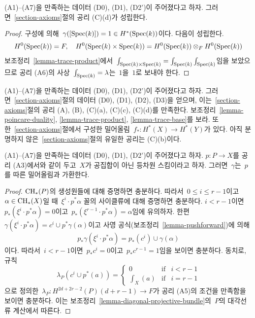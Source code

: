 \begin{lemma}
\label{lemma-trace-base}
(A1)--(A7)을 만족하는 데이터 (D0), (D1), (D2')이 주어졌다고 하자.
그러면\  \ref{section-axioms}절의 공리 (C)(d)가 성립한다.
\end{lemma}

\begin{proof}
구성에 의해\  $\gamma([\mathop{\mathrm{Spec}}(k)]) = 1 \in H^*(\mathop{\mathrm{Spec}}(k))$이다. 다음이
성립한다.
$$
H^0(\mathop{\mathrm{Spec}}(k)) = F,\quad
H^0(\mathop{\mathrm{Spec}}(k) \times \mathop{\mathrm{Spec}}(k)) = H^0(\mathop{\mathrm{Spec}}(k)) \otimes_F H^0(\mathop{\mathrm{Spec}}(k))
$$
보조정리\  \ref{lemma-trace-product}에서\ 
$\int_{\mathop{\mathrm{Spec}}(k) \times \mathop{\mathrm{Spec}}(k)} = \int_{\mathop{\mathrm{Spec}}(k)} \int_{\mathop{\mathrm{Spec}}(k)}$임을
보았으므로 공리 (A6)의 사상\  $\int_{\mathop{\mathrm{Spec}}(k)} = \lambda$는\  $1$을\ 
$1$로 보내야 한다.
\end{proof}

\noindent
(A1)--(A7)을 만족하는 데이터 (D0), (D1), (D2')이 주어졌다고 하자.
그러면\  \ref{section-axioms}절의 데이터 (D0), (D1), (D2), (D3)을
얻으며, 이는\  \ref{section-axioms}절의 공리 (A), (B), (C)(a),
(C)(c), (C)(d)를
만족한다. 보조정리\  \ref{lemma-poincare-duality},
\ref{lemma-trace-product}, \ref{lemma-trace-base}를 보라. 또한\ 
\ref{section-axioms}절에서 구성한 밀어올림\ 
$f_* : H^*(X) \to H^*(Y)$가 있다. 아직 분명하지 않은\ 
\ref{section-axioms}절의 유일한 공리는 (C)(b)이다.

\begin{lemma}
\label{lemma-ok-for-projective-bundle}
(A1)--(A7)을 만족하는 데이터 (D0), (D1), (D2')이 주어졌다고 하자.
$p : P \to X$를 공리 (A3)에서와 같이 두고\  $X$가 공집합이 아닌
등차원 스킴이라고 하자. 그러면\  $\gamma$는\  $p$를 따른 밀어올림과
가환한다.
\end{lemma}

\begin{proof}
$\mathop{\mathrm{CH}}\nolimits_*(P)$의 생성원들에 대해 증명하면 충분하다. 따라서\ 
$0 \leq i \leq r - 1$이고\  $\alpha \in \mathop{\mathrm{CH}}\nolimits_*(X)$일 때\ 
$\xi^i \cdot p^*\alpha$ 꼴의 사이클류에 대해 증명하면 충분하다.
$i < r - 1$이면\  $p_*(\xi^i \cdot p^*\alpha) = 0$이고\ 
$p_*(\xi^{r - 1} \cdot p^*\alpha) = \alpha$임에 유의하자. 한편\ 
$\gamma(\xi^i \cdot p^*\alpha) = c^i \cup p^*\gamma(\alpha)$이고
사영 공식(보조정리\  \ref{lemma-pushforward})에 의해
$$
p_*\gamma(\xi^i \cdot p^*\alpha) = p_*(c^i) \cup \gamma(\alpha)
$$
이다. 따라서\  $i < r - 1$이면\  $p_*c^i = 0$이고\ 
$p_*c^{r - 1} = 1$임을 보이면 충분하다. 동치로, 규칙
$$
\lambda_P(c^i \cup p^*(a)) =
\left\{
\begin{matrix}
0 & \text{if} & i < r - 1 \\
\int_X(a) & \text{if} & i = r - 1
\end{matrix}
\right.
$$
으로 정의한\ 
$\lambda_P : H^{2d + 2r - 2}(P)(d + r - 1) \to F$가 공리 (A5)의
조건을 만족함을 보이면 충분하다. 이는 보조정리\ 
\ref{lemma-diagonal-projective-bundle}의\  $P$의 대각선류 계산에서
따른다.
\end{proof}


